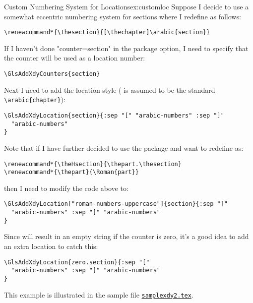 \documentclass[report,inlinetitle]{nlctdoc}
\newcounter{sample}
\newcommand*{\samplefile}[2][sample]{%
  \hyperref[ex:#1#2]{\texttt{#1#2.tex}}}
\begin{document}
\begin{example}{Custom Numbering System for Locations}{ex:customloc}
Suppose I decide to use a somewhat eccentric numbering
system for sections where I redefine  as follows:
\begin{verbatim}
\renewcommand*{\thesection}{[\thechapter]\arabic{section}}
\end{verbatim}
If I haven't done "counter=section" in the package
option, I need to specify that the counter will be used as a
location number:
\begin{verbatim}
\GlsAddXdyCounters{section}
\end{verbatim}
Next I need to add the location style ( is assumed to
be the standard \verb"\arabic{chapter}"):
\begin{verbatim}
\GlsAddXdyLocation{section}{:sep "[" "arabic-numbers" :sep "]"
  "arabic-numbers"
}
\end{verbatim}
Note that if I have further decided to use the 
package and want to redefine  as:
\begin{verbatim}
\renewcommand*{\theHsection}{\thepart.\thesection}
\renewcommand*{\thepart}{\Roman{part}}
\end{verbatim}
then I need to modify the  code above to:
\begin{verbatim}
\GlsAddXdyLocation["roman-numbers-uppercase"]{section}{:sep "[" 
  "arabic-numbers" :sep "]" "arabic-numbers"
}
\end{verbatim}
Since  will result in an empty string if the counter is
zero, it's a good idea to add an extra location to catch this:
\begin{verbatim}
\GlsAddXdyLocation{zero.section}{:sep "[" 
  "arabic-numbers" :sep "]" "arabic-numbers"
}
\end{verbatim}
This example is illustrated in the sample file
\samplefile{xdy2}.
\end{example}
\end{document}
